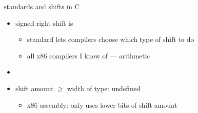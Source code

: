 \begin{frame}{standards and shifts in C}
    \begin{itemize}
    \item signed right shift is 
        \begin{itemize}
        \item standard lets compilers choose which type of shift to do
        \item all x86 compilers I know of --- arithmetic
        \end{itemize}
    \item {}
    \vspace{.5cm}
    \item shift amount $\ge$ width of type: undefined
        \begin{itemize}
        \item x86 assembly: only uses lower bits of shift amount
        \end{itemize}
    \vspace{.5cm}
    \end{itemize}
\end{frame}

